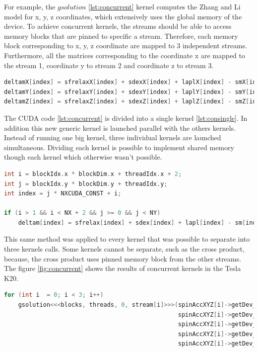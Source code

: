 For example, the $gsolution$ \ref{lst:concurrent} kernel computes the Zhang and Li model for x, y, z coordinates, which extensively uses the global memory of the device. To achieve concurrent kernels, the streams should be able to access memory blocks that are pinned to specific a stream. Therefore, each memory block corresponding to x, y, z coordinate are mapped to 3 independent streams. Furthermore, all the matrices corresponding to the coordinate x are mapped to the stream 1, coordinate y to stream 2 and coordinate z to stream 3.

\begin{lstlisting}[language=C++, label={lst:concurrent}, caption={Evaluation of x, y, z coordinates of the Zhang and Li model in a single kernel.}]
deltamX[index] = sfrelaxX[index] + sdexX[index] + laplX[index] - smX[index];
deltamY[index] = sfrelaxY[index] + sdexY[index] + laplY[index] - smY[index];
deltamZ[index] = sfrelaxZ[index] + sdexZ[index] + laplZ[index] - smZ[index];
\end{lstlisting}
 
The CUDA code \ref{lst:concurrent} is divided into a single kernel \ref{lst:consingle}. In addition this new generic kernel is launched parallel with the others kernels. Instead of running one big kernel, three individual kernels are launched simultaneous. Dividing each kernel is possible to implement shared memory though each kernel which otherwise wasn't possible. 

\begin{lstlisting}[language=C++, label={lst:consingle}, caption={Evaluation of individual coordinates of the Zhang and Li model}]
int i = blockIdx.x * blockDim.x + threadIdx.x + 2;
int j = blockIdx.y * blockDim.y + threadIdx.y;
int index = j * NXCUDA_CONST + i;

if (i > 1 && i < NX + 2 && j >= 0 && j < NY)
	deltam[index] = sfrelax[index] + sdex[index] + lapl[index] - sm[index];
\end{lstlisting}

This same method was applied to every kernel that was possible to separate into three kernels calls. Some kernels cannot be separate, such as the cross product, because, the cross product uses pinned memory block from the other streams. The figure \ref{fig:concurrent} shows the results of concurrent kernels in the Tesla K20.

\begin{lstlisting}[language=C++, caption={Evaluate Zhang and Li model.}]
for (int i  = 0; i < 3; i++)
	gsolution<<<blocks, threads, 0, stream[i]>>>(spinAccXYZ[i]->getDev_deltam(),
												 spinAccXYZ[i]->getDev_sfrelax(), 
												 spinAccXYZ[i]->getDev_sm(), 
											 	 spinAccXYZ[i]->getDev_sdex(),
											 	 spinAccXYZ[i]->getDev_lapl());
\end{lstlisting}

